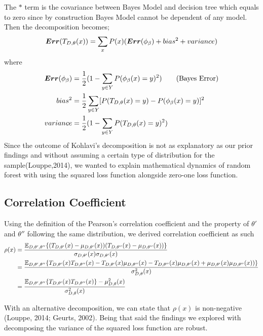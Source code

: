 The $*$ term is the covariance between Bayes Model and decision tree which equals to zero since by construction Bayes Model cannot be dependent of any model. Then the decomposition becomes;
\begin{align}
\boldsymbol{Err}(T_{D, \theta}(x)) = \sum_{x} P(x)(\boldsymbol{Err}(\phi_{\beta}) + bias^2 + variance) \notag
\end{align}
where
\begin{align}
\boldsymbol{Err}(\phi_{\beta}) & = \dfrac{1}{2}(1 - \sum_{y \in Y}P(\phi_{\beta}(x) = y)^2)\tag{Bayes Error} \\
bias^2 & = \dfrac{1}{2}\sum_{y \in Y} [P(T_{D,\theta}(x)=y) - P(\phi_{\beta}(x) = y)]^2\notag \\
variance & = \dfrac{1}{2}(1 - \sum_{y \in Y}P(T_{D, \theta}(x) = y)^2) \notag
\end{align}
Since the outcome of Kohlavi's decomposition is not as explanatory as our prior findings and without assuming a certain type of distribution for the sample(Louppe,2014), we wanted to explain mathematical dynamics of random forest with using the squared loss function alongside zero-one loss function.

\subsection{Correlation Coefficient}
Using the definition of the Pearson's correlation coefficient and the property of $\theta'$ and $\theta''$ following the same distribution, we derived correlation coefficient as such
\begin{align}
\rho(x) & = \dfrac{\mathbb{E}_{D,\theta',\theta''}\{(T_{D,\theta'}(x) - \mu_{D,\theta'}(x))(T_{D,\theta''}(x) - \mu_{D,\theta''}(x))\} }				{\sigma_{D,\theta'}(x)\sigma_{D,\theta'}(x)}\notag \\
		& = \dfrac{\mathbb{E}_{D,\theta',\theta''}\{T_{D,\theta'}(x)T_{D,\theta''}(x) - T_{D,\theta'}(x)\mu_{D,\theta''}(x) - T_{D,								\theta''}(x)\mu_{D,\theta'}(x) + \mu_{D,\theta'}(x)\mu_{D,\theta''}(x))\} }
				{\sigma_{D,\theta}^2(x)} \notag \\
		& = \dfrac{\mathbb{E}_{D,\theta',\theta''}\{T_{D,\theta'}(x) T_{D,\theta''}(x)\} - \mu_{D,\theta}^2(x)}{\sigma_{D,\theta}^2(x)}\notag
\end{align}

With an alternative decomposition, we can state that $\rho(x)$ is non-negative (Louppe, 2014; Geurts, 2002). Being that said the findings we explored with decomposing the variance of the squared loss function are robust.

